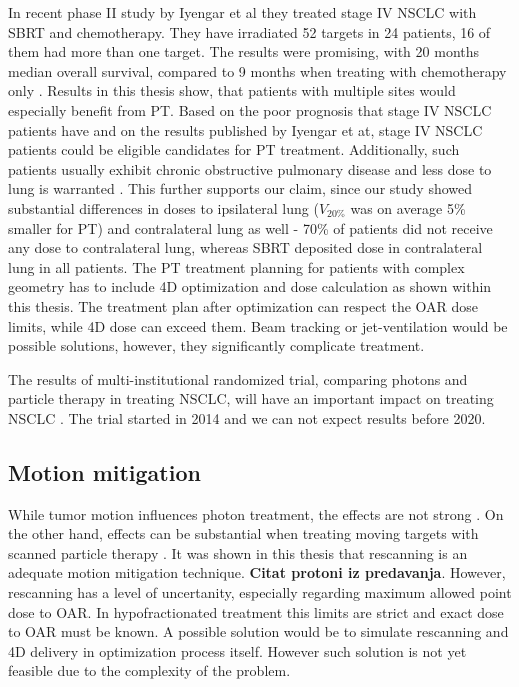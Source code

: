 \documentclass[type=dr, dr=rernat, accentcolor=tud7b,colorbacktitle, bigchapter, openright, twoside, 12pt ]{tudthesis}
\begin{document}
In recent phase II study by Iyengar et al \cite{Iyengar2014} they treated stage IV NSCLC with SBRT and chemotherapy. They have irradiated 52 targets in 24 patients, 16 of them had more than one target. The results were promising, with 20 months median overall survival, 
compared to 9 months when treating with chemotherapy only \cite{Tsao2008}. Results in this thesis show, that patients with multiple sites would especially benefit from PT. Based on the poor prognosis that stage IV NSCLC patients have and on the results published by Iyengar et at,
stage IV NSCLC patients could be eligible candidates for PT treatment. Additionally, such patients usually exhibit chronic obstructive pulmonary disease and less dose to lung is warranted \cite{Westover2012}. This further supports our claim, since our study showed substantial differences in 
doses to ipsilateral lung ($V_{20\%}$ was on average 5\% smaller for PT) and contralateral lung as well - 70\% of patients did not receive any dose to contralateral lung, whereas SBRT deposited dose in contralateral lung in all patients.
The PT treatment planning for patients with complex geometry has to include 4D optimization and dose calculation as shown within this thesis. The treatment plan after optimization can respect the
OAR dose limits, while 4D dose can exceed them. Beam tracking \cite{Bert2007} or jet-ventilation \cite{Santiago2013} would be possible solutions, however, they significantly complicate treatment.

The results of multi-institutional randomized trial, comparing photons and particle therapy in treating NSCLC, will have an important impact on treating NSCLC \cite{RTOG1308}. 
The trial started in 2014 and we can not expect results before 2020.

\subsection{Motion mitigation}

While tumor motion influences photon treatment, the effects are not strong \cite{Zou2014}. On the other hand, effects can be substantial when treating moving targets with scanned particle therapy \cite{Bert2008}.
It was shown in this thesis that rescanning is an adequate motion mitigation technique. \textbf{Citat protoni iz predavanja}. However, rescanning has a level of uncertanity, especially regarding maximum allowed point dose to OAR.
In hypofractionated treatment this limits are strict and exact dose to OAR must be known. A possible solution would be to simulate rescanning and 4D delivery in optimization process itself. 
However such solution is not yet feasible due to the complexity of the problem.
\end{document}

